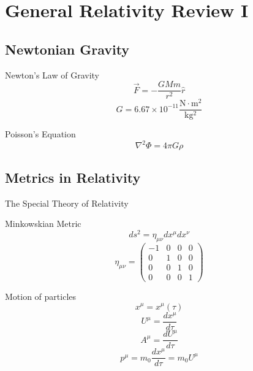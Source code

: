 \documentclass{beamer}
\begin{document}
    
    

    


  	\section{General Relativity Review I}
  	\begin{darkframes}
  
    	\subsection{Newtonian Gravity}
    	\begin{frame}{Newton's Law of Gravity}
			$$ \vec{F} = - \frac{G M m }{r^{2}} \hat{r}$$  
       		\pause
       		$$ G = 6.67 \times 10 ^{-11} \frac{\mathrm{N \cdot m^{2}}}{\mathrm{kg^{2}}} $$  
    	\end{frame}
    
    	\begin{frame}{Poisson's Equation}
			$$ \nabla^{2} \Phi =  4 \pi G \rho $$  
    	\end{frame}
    
    \subsection{Metrics in Relativity}
    	\begin{frame}
        	\LARGE
            {The Special Theory of Relativity}
    	\end{frame}
        
    	\begin{frame}{Minkowskian Metric}
    		$$ ds^{2} = \eta_{\mu \nu} dx^{\mu} dx^{\nu} $$
            \pause
            $$ \eta_{\mu \nu} = \left( \begin{array}{cccc}
          		-1 & 0 & 0 & 0 \\
           		0 & 1 & 0 & 0\\
           		0 & 0 & 1 & 0\\ 
           		0 & 0 & 0 & 1
          	\end{array}\right) $$
    	\end{frame}
        
        \begin{frame}{Motion of particles}
        	$$ x^\mu = x^\mu (\tau) $$
            \pause
    		$$ U^\mu =\frac{dx^\mu}{d\tau} $$
            \pause
            $$ A^\mu =\frac{dU^\mu}{d\tau} $$  
            \pause
            \bigskip
            $$ p^\mu = m_0 \frac{dx^\mu}{d\tau} = m_0 U^\mu $$
    	\end{frame}
		

\end{darkframes}
\end{document}
